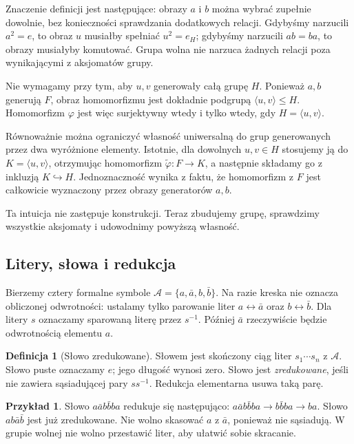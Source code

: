 \documentclass[11pt,a4paper]{article}
\numberwithin{equation}{section}
\theoremstyle{plain}
\theoremstyle{definition}
\newtheorem{definicja}[twierdzenie]{Definicja}
\newtheorem{przyklad}[twierdzenie]{Przykład}
\theoremstyle{remark}
\begin{document}
Znaczenie definicji jest następujące: obrazy $a$ i $b$ można wybrać
zupełnie dowolnie, bez konieczności sprawdzania dodatkowych relacji.
Gdybyśmy narzucili $a^2=e$, to obraz $u$ musiałby spełniać $u^2=e_H$;
gdybyśmy narzucili $ab=ba$, to obrazy musiałyby komutować.
Grupa wolna nie narzuca żadnych relacji poza wynikającymi
z aksjomatów grupy.

Nie wymagamy przy tym, aby $u,v$ generowały całą grupę $H$.
Ponieważ $a,b$ generują $F$, obraz homomorfizmu jest dokładnie
podgrupą $\langle u,v\rangle\leq H$. Homomorfizm $\varphi$
jest więc surjektywny wtedy i tylko wtedy, gdy
$H=\langle u,v\rangle$.

Równoważnie można ograniczyć własność uniwersalną do grup
generowanych przez dwa wyróżnione elementy. Istotnie, dla dowolnych
$u,v\in H$ stosujemy ją do $K=\langle u,v\rangle$, otrzymując
homomorfizm $\widetilde\varphi:F\to K$, a następnie składamy go
z inkluzją $K\hookrightarrow H$. Jednoznaczność wynika z faktu,
że homomorfizm z $F$ jest całkowicie wyznaczony przez obrazy
generatorów $a,b$.

Ta intuicja nie zastępuje konstrukcji. Teraz zbudujemy grupę, sprawdzimy wszystkie aksjomaty i udowodnimy powyższą własność.

\subsection{Litery, słowa i redukcja}
Bierzemy cztery formalne symbole $\mathcal A=\{a,\bar a,b,\bar b\}$. Na razie kreska nie oznacza obliczonej odwrotności: ustalamy tylko parowanie liter $a\leftrightarrow\bar a$ oraz $b\leftrightarrow\bar b$. Dla litery $s$ oznaczamy sparowaną literę przez $s^{-1}$. Później $\bar a$ rzeczywiście będzie odwrotnością elementu $a$.
\begin{definicja}[Słowo zredukowane]
Słowem jest skończony ciąg liter $s_1\cdots s_n$ z $\mathcal A$. Słowo puste oznaczamy $e$; jego długość wynosi zero. Słowo jest \emph{zredukowane}, jeśli nie zawiera sąsiadującej pary $ss^{-1}$. Redukcja elementarna usuwa taką parę.
\end{definicja}
\begin{przyklad}
Słowo $a\bar a b\bar b ba$ redukuje się następująco: $a\bar a b\bar b ba\longrightarrow b\bar b ba\longrightarrow ba$. Słowo $ab\bar a\bar b$ jest już zredukowane. Nie wolno skasować $a$ z $\bar a$, ponieważ nie sąsiadują. W grupie wolnej nie wolno przestawić liter, aby ułatwić sobie skracanie.
\end{przyklad}
\end{document}
